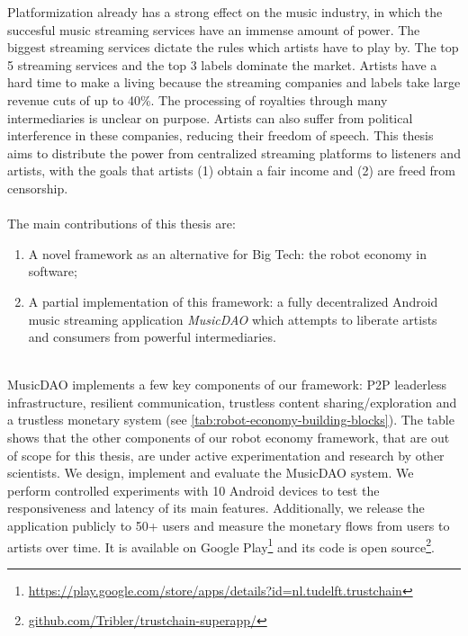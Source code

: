 Platformization already has a strong effect on the music industry, in which the succesful music streaming services have an immense amount of power. The biggest streaming services dictate the rules which artists have to play by. The top 5 streaming services and the top 3 labels dominate the market.
Artists have a hard time to make a living because the streaming companies and labels take large revenue cuts of up to 40\%. The processing of royalties through many intermediaries is unclear on purpose. Artists can also suffer from political interference in these companies, reducing their freedom of speech. This thesis aims to distribute the power from centralized streaming platforms to listeners and artists, with the goals that artists (1) obtain a fair income and (2) are freed from censorship. 
\\
\\
The main contributions of this thesis are:
\begin{enumerate}
    \item A novel framework as an alternative for Big Tech: the robot economy in software;
    \item A partial implementation of this framework: a fully decentralized Android music streaming application \textit{MusicDAO} which attempts to liberate artists and consumers from powerful intermediaries.
\end{enumerate}
\\
MusicDAO implements a few key components of our framework: P2P leaderless infrastructure, resilient communication, trustless content sharing/exploration and a trustless monetary system (see \ref{tab:robot-economy-building-blocks}). The table shows that the other components of our robot economy framework, that are out of scope for this thesis, are under active experimentation and research by other scientists. We design, implement and evaluate the MusicDAO system. We perform controlled experiments with 10 Android devices to test the responsiveness and latency of its main features. Additionally, we release the application publicly to 50+ users and measure the monetary flows from users to artists over time. 
It is available on Google Play\footnote{\url{https://play.google.com/store/apps/details?id=nl.tudelft.trustchain}} and its code is open source\footnote{\url{github.com/Tribler/trustchain-superapp/}}.



